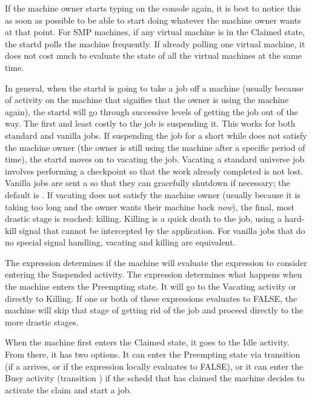 If the machine owner starts typing on the console again,
it is best to notice this as
soon as possible to be able to start doing whatever 
the machine owner wants at that point.
For SMP machines, if any virtual machine is in the Claimed state, the
startd polls the machine frequently.
If already polling one virtual machine, it does not
cost much to evaluate the state of all the virtual machines at
the same time.

In general, when the startd is going to take a job off a machine
(usually because of activity on the machine that signifies that the
owner is using the machine again),
the startd will go through
successive levels of getting the job out of the way.
The first and least costly to the job is suspending it.
This works for both standard and vanilla jobs.
If suspending the job for a short while does not satisfy the machine
owner (the owner is still using the machine after a specific period of
time), the startd moves on to vacating the job.
Vacating a standard universe job
involves performing a checkpoint so that the work already completed
is not lost.  Vanilla jobs are sent a  so that they
can gracefully shutdown if necessary; the default is \verb@SIGTERM@.
If vacating does not satisfy the machine owner (usually because it is
taking too long and the owner wants their machine back \emph{now}),
the final, most drastic stage is reached: killing.  
Killing is a quick death to the job, using a hard-kill signal that cannot
be intercepted by the application.  For vanilla jobs that do no special
signal handling, vacating and killing are equivalent.

The  expression determines if the machine will
evaluate the  expression to consider entering the
Suspended activity.
The  expression determines what happens when the
machine enters the Preempting state.
It will go to the Vacating
activity or directly to Killing. 
If one or both of these expressions evaluates to FALSE, the machine
will skip that stage of getting rid of the job and proceed directly to
the more drastic stages.

When the machine first enters the Claimed state, it goes to the Idle
activity.  From there, it has two options.  
It can enter the Preempting state via transition  (if a 
 arrives, or if the  expression locally
evaluates to FALSE),  
or it can enter the Busy activity (transition ) if the
schedd that has claimed the machine decides to activate the claim and
start a job.

